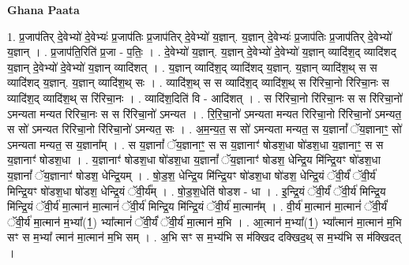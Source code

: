 \documentclass[17pt]{extarticle}
\begin{document}
\textbf{Ghana Paata } \newline

1. प्र॒जाप॑तिर् दे॒वेभ्यो॑ दे॒वेभ्यः॑ प्र॒जाप॑तिः प्र॒जाप॑तिर् दे॒वेभ्यो॑ य॒ज्ञान्. य॒ज्ञान् दे॒वेभ्यः॑ प्र॒जाप॑तिः प्र॒जाप॑तिर् दे॒वेभ्यो॑ य॒ज्ञान् । . प्र॒जाप॑ति॒रिति॑ प्र॒जा - प॒तिः॒ । . दे॒वेभ्यो॑ य॒ज्ञान्. य॒ज्ञान् दे॒वेभ्यो॑ दे॒वेभ्यो॑ य॒ज्ञान् व्यादि॑श॒द् व्यादि॑शद् य॒ज्ञान् दे॒वेभ्यो॑ दे॒वेभ्यो॑ य॒ज्ञान् व्यादि॑शत् । . य॒ज्ञान् व्यादि॑श॒द् व्यादि॑शद् य॒ज्ञान्. य॒ज्ञान् व्यादि॑श॒थ् स स व्यादि॑शद् य॒ज्ञान्. य॒ज्ञान् व्यादि॑श॒थ् सः । . व्यादि॑श॒थ् स स व्यादि॑श॒द् व्यादि॑श॒थ् स रि॑रिचा॒नो रि॑रिचा॒नः स व्यादि॑श॒द् व्यादि॑श॒थ् स रि॑रिचा॒नः । . व्यादि॑श॒दिति॑ वि - आदि॑शत् । . स रि॑रिचा॒नो रि॑रिचा॒नः स स रि॑रिचा॒नो॑ ऽमन्यता मन्यत रिरिचा॒नः स स रि॑रिचा॒नो॑ ऽमन्यत । . रि॒रि॒चा॒नो॑ ऽमन्यता मन्यत रिरिचा॒नो रि॑रिचा॒नो॑ ऽमन्यत॒ स सो॑ ऽमन्यत रिरिचा॒नो रि॑रिचा॒नो॑ ऽमन्यत॒ सः । . अ॒म॒न्य॒त॒ स सो॑ ऽमन्यता मन्यत॒ स य॒ज्ञानां᳚ ॅय॒ज्ञानाꣳ॒॒ सो॑ ऽमन्यता मन्यत॒ स य॒ज्ञाना᳚म् । . स य॒ज्ञानां᳚ ॅय॒ज्ञानाꣳ॒॒ स स य॒ज्ञानाꣳ॑ षोडश॒धा षो॑डश॒धा य॒ज्ञानाꣳ॒॒ स स य॒ज्ञानाꣳ॑ षोडश॒धा । . य॒ज्ञानाꣳ॑ षोडश॒धा षो॑डश॒धा य॒ज्ञानां᳚ ॅय॒ज्ञानाꣳ॑ षोडश॒ धेन्द्रि॒य मि॑न्द्रि॒यꣳ षो॑डश॒धा य॒ज्ञानां᳚ ॅय॒ज्ञानाꣳ॑ षोडश॒ धेन्द्रि॒यम् । . षो॒ड॒श॒ धेन्द्रि॒य मि॑न्द्रि॒यꣳ षो॑डश॒धा षो॑डश॒ धेन्द्रि॒यं ॅवी॒र्यं॑ ॅवी॒र्य॑ मिन्द्रि॒यꣳ षो॑डश॒धा षो॑डश॒ धेन्द्रि॒यं ॅवी॒र्य᳚म् । . षो॒ड॒श॒धेति॑ षोडश - धा । . इ॒न्द्रि॒यं ॅवी॒र्यं॑ ॅवी॒र्य॑ मिन्द्रि॒य मि॑न्द्रि॒यं ॅवी॒र्य॑ मा॒त्मान॑ मा॒त्मानं॑ ॅवी॒र्य॑ मिन्द्रि॒य मि॑न्द्रि॒यं ॅवी॒र्य॑ मा॒त्मान᳚म् । . वी॒र्य॑ मा॒त्मान॑ मा॒त्मानं॑ ॅवी॒र्यं॑ ॅवी॒र्य॑ मा॒त्मान॑ म॒भ्या᳚(1॒) भ्या᳚त्मानं॑ ॅवी॒र्यं॑ ॅवी॒र्य॑ मा॒त्मान॑ म॒भि । . आ॒त्मान॑ म॒भ्या᳚(1॒) भ्या᳚त्मान॑ मा॒त्मान॑ म॒भि सꣳ स म॒भ्या᳚ त्मान॑ मा॒त्मान॑ म॒भि सम् । . अ॒भि सꣳ स म॒भ्य॑भि स म॑क्खिद दक्खिद॒थ् स म॒भ्य॑भि स म॑क्खिदत् । \newline
\end{document}
